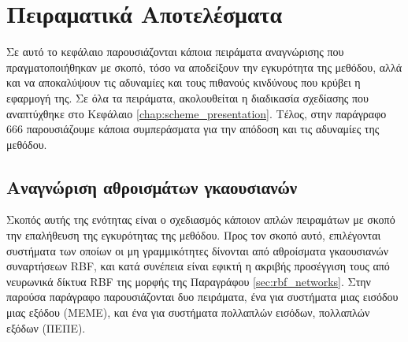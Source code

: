 \chapter{Πειραματικά Αποτελέσματα}
Σε αυτό το κεφάλαιο παρουσιάζονται κάποια πειράματα αναγνώρισης που πραγματοποιήθηκαν με σκοπό, τόσο να αποδείξουν την εγκυρότητα της μεθόδου, αλλά και να αποκαλύψουν τις αδυναμίες και τους πιθανούς κινδύνους που κρύβει η εφαρμογή της. Σε όλα τα πειράματα, ακολουθείται η διαδικασία σχεδίασης που αναπτύχθηκε στο Κεφάλαιο \ref{chap:scheme_presentation}. Τέλος, στην παράγραφο 666 παρουσιάζουμε κάποια συμπεράσματα για την απόδοση και τις αδυναμίες της μεθόδου.



\section{Αναγνώριση αθροισμάτων γκαουσιανών}
Σκοπός αυτής της ενότητας είναι ο σχεδιασμός κάποιον απλών πειραμάτων με σκοπό την επαλήθευση της εγκυρότητας της μεθόδου. Προς τον σκοπό αυτό, επιλέγονται συστήματα των οποίων οι μη γραμμικότητες δίνονται από αθροίσματα γκαουσιανών συναρτήσεων RBF, και κατά συνέπεια είναι εφικτή η ακριβής προσέγγιση τους από νευρωνικά δίκτυα RBF της μορφής της Παραγράφου \ref{sec:rbf_networks}. Στην παρούσα παράγραφο παρουσιάζονται δυο πειράματα, ένα για συστήματα μιας εισόδου μιας εξόδου (ΜΕΜΕ), και ένα για συστήματα πολλαπλών εισόδων, πολλαπλών εξόδων (ΠΕΠΕ).
